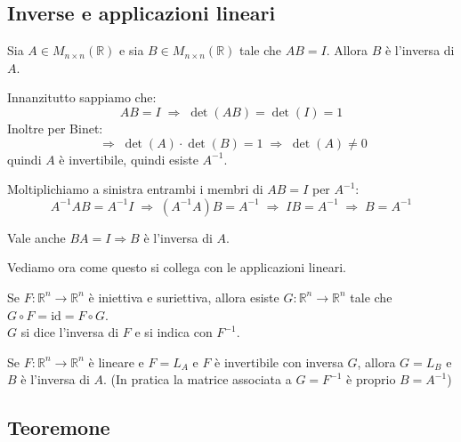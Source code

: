 \documentclass[
  a4paper,
]{article}
\begin{document}
\hypertarget{inverse-e-applicazioni-lineari}{%
\subsection{Inverse e applicazioni
lineari}\label{inverse-e-applicazioni-lineari}}

\begin{propositionbox}
Sia \(A \in M_{n \times n}(\mathbb{R})\) e sia
\(B \in M_{n \times n}(\mathbb{R})\) tale che \(AB = I\). Allora \(B\) è
l'inversa di \(A\).
\end{propositionbox}

\begin{proofbox}
Innanzitutto sappiamo che: \[
AB = I \;\Longrightarrow\; \det(AB) = \det(I) = 1
\] Inoltre per Binet: \[
\;\Longrightarrow\; \det(A)\cdot\det(B) = 1 \;\Longrightarrow\; \det(A) \not = 0
\] quindi \(A\) è invertibile, quindi esiste \(A^{-1}\).

Moltiplichiamo a sinistra entrambi i membri di \(AB = I\) per
\(A^{-1}\): \[
A^{-1}AB = A^{-1}I \;\Longrightarrow\; (A^{-1}A)B = A^{-1} \;\Longrightarrow\; IB = A^{-1} \;\Longrightarrow\; B = A^{-1}
\]
\end{proofbox}

\begin{notebox}
Vale anche \(BA = I \Rightarrow B\) è l'inversa di \(A\).
\end{notebox}

Vediamo ora come questo si collega con le applicazioni lineari.

\begin{observationbox}
Se \(F : \mathbb{R}^n \to \mathbb{R}^n\) è iniettiva e suriettiva,
allora esiste \(G: \mathbb{R}^n \to \mathbb{R}^n\) tale che
\(G \circ F = \text{id} = F \circ G\).\\
\(G\) si dice l'inversa di \(F\) e si indica con \(F^{-1}\).
\end{observationbox}

\begin{observationbox}
Se \(F : \mathbb{R}^n \to \mathbb{R}^n\) è lineare e \(F = L_A\) e \(F\)
è invertibile con inversa \(G\), allora \(G = L_B\) e \(B\) è l'inversa
di \(A\). (In pratica la matrice associata a \(G = F^{-1}\) è proprio
\(B = A^{-1}\))
\end{observationbox}

\hypertarget{teoremone}{%
\subsection{Teoremone}\label{teoremone}}
\end{document}
